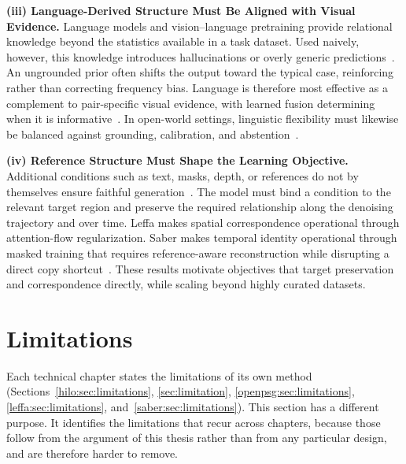 \noindent \textbf{(iii) Language-Derived Structure Must Be Aligned with Visual Evidence.}
Language models and vision--language pretraining provide relational knowledge beyond the statistics available in a task dataset. Used naively, however, this knowledge introduces hallucinations or overly generic predictions~\citep{radford2021learning, min2023recent, zhang2024vision}. An ungrounded prior often shifts the output toward the typical case, reinforcing rather than correcting frequency bias. Language is therefore most effective as a complement to pair-specific visual evidence, with learned fusion determining when it is informative~\citep{zhou2025vlprompt}. In open-world settings, linguistic flexibility must likewise be balanced against grounding, calibration, and abstention~\citep{wu2024towards, zhang2024vision}.

\noindent \textbf{(iv) Reference Structure Must Shape the Learning Objective.}
Additional conditions such as text, masks, depth, or references do not by themselves ensure faithful generation~\citep{zhang2023adding, xie2023boxdiff}. The model must bind a condition to the relevant target region and preserve the required relationship along the denoising trajectory and over time. Leffa makes spatial correspondence operational through attention-flow regularization. Saber makes temporal identity operational through masked training that requires reference-aware reconstruction while disrupting a direct copy shortcut~\citep{zhou2025learning, zhou2025scaling}. These results motivate objectives that target preservation and correspondence directly, while scaling beyond highly curated datasets.

\section{Limitations}
\label{sec:thesis_limitations}
Each technical chapter states the limitations of its own method (Sections~\ref{hilo:sec:limitations}, \ref{sec:limitation}, \ref{openpsg:sec:limitations}, \ref{leffa:sec:limitations}, and~\ref{saber:sec:limitations}). This section has a different purpose. It identifies the limitations that recur across chapters, because those follow from the argument of this thesis rather than from any particular design, and are therefore harder to remove.

